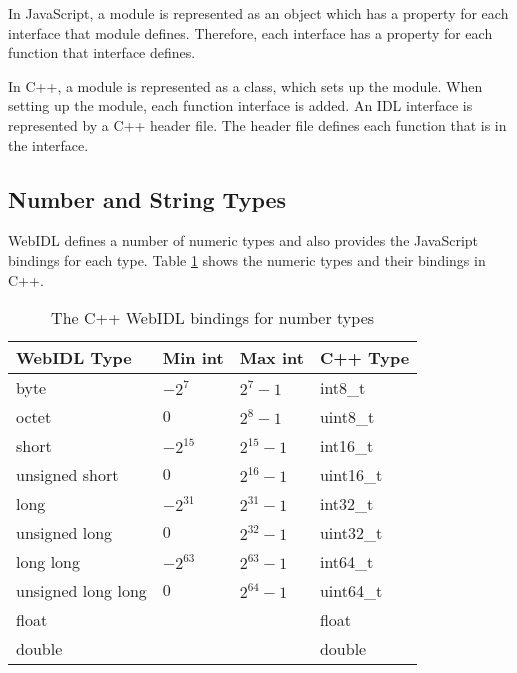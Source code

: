 In JavaScript, a module is represented as an object which has a property for each interface that module defines. Therefore, each interface has a property for each function that interface defines. 

In C++, a module is represented as a class, which sets up the module. When setting up the module, each function interface is added. An IDL interface is represented by a C++ header file. The header file defines each function that is in the interface.


\subsection{Number and String Types} %
\label{sub:number_types}
WebIDL defines a number of numeric types and also provides the JavaScript bindings for each type. Table \ref{table:webidl_cpp_numbers} shows the numeric types and their bindings in C++.

\begin{table}[h]
\centering
\begin{tabular}{l|lll}
\textbf{WebIDL Type} & \textbf{Min int} & \textbf{Max int} & \textbf{C++ Type}  \\ \hline
byte                 & $-2^{7}$         & $2^{7}-1$        & int8\_t            \\
octet                & $0$              & $2^{8}-1$        & uint8\_t           \\
short                & $-2^{15}$        & $2^{15}-1$       & int16\_t           \\
unsigned short       & $0$              & $2^{16}-1$       & uint16\_t          \\
long                 & $-2^{31}$        & $2^{31}-1$       & int32\_t           \\
unsigned long        & $0$              & $2^{32}-1$       & uint32\_t          \\
long long            & $-2^{63}$        & $2^{63}-1$       & int64\_t           \\
unsigned long long   & $0$              & $2^{64}-1$       & uint64\_t          \\
float                &                  &                  & float              \\
double               &                  &                  & double           
\end{tabular}
\caption{The C++ WebIDL bindings for number types}
\label{table:webidl_cpp_numbers}
\end{table}

